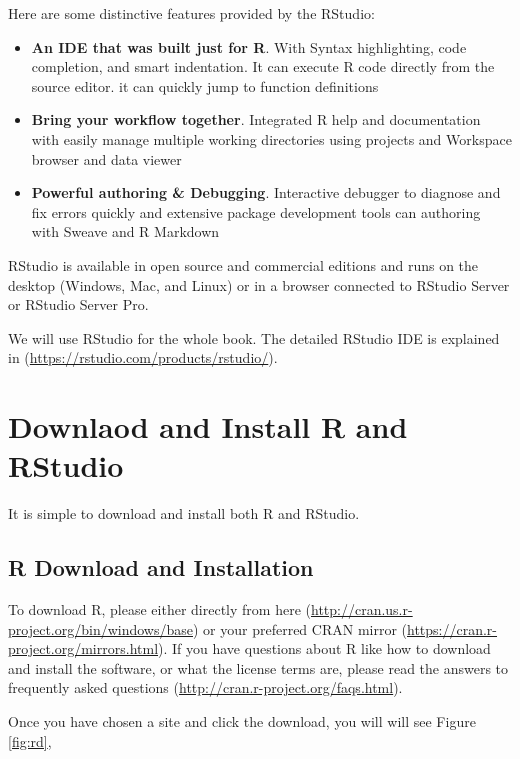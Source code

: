 \documentclass[
]{book}
\providecommand{\tightlist}{%
  \setlength{\itemsep}{0pt}\setlength{\parskip}{0pt}}
\begin{document}
Here are some distinctive features provided by the RStudio:

\begin{itemize}
\tightlist
\item
  \textbf{An IDE that was built just for R}. With Syntax highlighting, code completion, and smart indentation. It can execute R code directly from the source editor. it can quickly jump to function definitions
\item
  \textbf{Bring your workflow together}. Integrated R help and documentation with easily manage multiple working directories using projects and Workspace browser and data viewer
\item
  \textbf{Powerful authoring \& Debugging}. Interactive debugger to diagnose and fix errors quickly and extensive package development tools can authoring with Sweave and R Markdown
\end{itemize}

RStudio is available in open source and commercial editions and runs on the desktop (Windows, Mac, and Linux) or in a browser connected to RStudio Server or RStudio Server Pro.

We will use RStudio for the whole book. The detailed RStudio IDE is explained in (\url{https://rstudio.com/products/rstudio/}).

\hypertarget{downlaod-and-install-r-and-rstudio}{%
\section{Downlaod and Install R and RStudio}\label{downlaod-and-install-r-and-rstudio}}

It is simple to download and install both R and RStudio.

\hypertarget{r-download-and-installation}{%
\subsection*{R Download and Installation}\label{r-download-and-installation}}


To download R, please either directly from here (\url{http://cran.us.r-project.org/bin/windows/base}) or your preferred CRAN mirror (\url{https://cran.r-project.org/mirrors.html}). If you have questions about R like how to download and install the software, or what the license terms are, please read the answers to frequently asked questions (\url{http://cran.r-project.org/faqs.html}).

Once you have chosen a site and click the download, you will will see Figure \ref{fig:rd},
\end{document}
